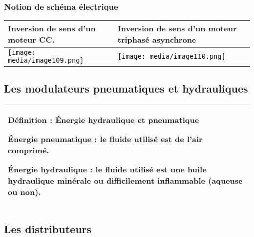 \documentclass[
]{article}
\begin{document}
\hypertarget{notion-de-schuxe9ma-uxe9lectrique}{%
\subsubsection{Notion de schéma
électrique}\label{notion-de-schuxe9ma-uxe9lectrique}}

\begin{longtable}[]{@{}ll@{}}
\toprule
\textbf{Inversion de sens d'un moteur CC.} & \textbf{Inversion de sens
d'un moteur triphasé asynchrone} \\
\midrule
\endhead
\texttt{[image: media/image109.png]} &
\texttt{[image: media/image110.png]} \\
\bottomrule
\end{longtable}

\hypertarget{les-modulateurs-pneumatiques-et-hydrauliques}{%
\subsection{Les modulateurs pneumatiques et
hydrauliques}\label{les-modulateurs-pneumatiques-et-hydrauliques}}

\begin{longtable}[]{@{}
  >{\raggedright\arraybackslash}p{}@{}}
\toprule
\endhead
\textbf{Définition : Énergie hydraulique et pneumatique}

\textbf{Énergie pneumatique} : le fluide utilisé est de l'air comprimé.

\textbf{Énergie hydraulique} : le fluide utilisé est une huile
hydraulique minérale ou difficilement inflammable (aqueuse ou non). \\
\bottomrule
\end{longtable}

\hypertarget{les-distributeurs}{%
\subsection{Les distributeurs}\label{les-distributeurs}}
\end{document}
